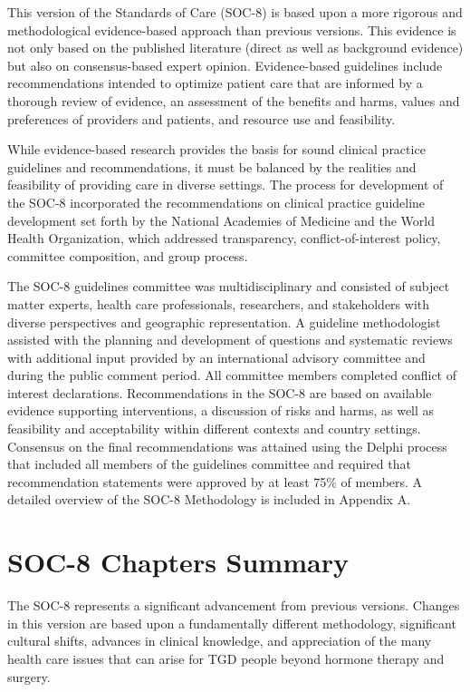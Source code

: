 \documentclass[
]{book}
\begin{document}
This version of the Standards of Care (SOC-8)
is based upon a more rigorous and methodological evidence-based approach than previous versions. This evidence is not only based on the
published literature (direct as well as background
evidence) but also on consensus-based expert
opinion. Evidence-based guidelines include recommendations intended to optimize patient care
that are informed by a thorough review of evidence, an assessment of the benefits and harms,
values and preferences of providers and patients,
and resource use and feasibility.

While evidence-based research provides the
basis for sound clinical practice guidelines and
recommendations, it must be balanced by the
realities and feasibility of providing care in
diverse settings. The process for development of
the SOC-8 incorporated the recommendations on
clinical practice guideline development set forth
by the National Academies of Medicine and the
World Health Organization, which addressed
transparency, conflict-of-interest policy, committee composition, and group process.

The SOC-8 guidelines committee was multidisciplinary and consisted of subject matter experts,
health care professionals, researchers, and stakeholders with diverse perspectives and geographic
representation. A guideline methodologist assisted
with the planning and development of questions
and systematic reviews with additional input provided by an international advisory committee and
during the public comment period. All committee
members completed conflict of interest declarations. Recommendations in the SOC-8 are based
on available evidence supporting interventions, a
discussion of risks and harms, as well as feasibility
and acceptability within different contexts and
country settings. Consensus on the final recommendations was attained using the Delphi process
that included all members of the guidelines committee and required that recommendation statements were approved by at least 75\% of members.
A detailed overview of the SOC-8 Methodology
is included in Appendix A.

\hypertarget{soc-8-chapters-summary}{%
\section*{SOC-8 Chapters Summary}\label{soc-8-chapters-summary}}

The SOC-8 represents a significant advancement
from previous versions. Changes in this version
are based upon a fundamentally different methodology, significant cultural shifts, advances in
clinical knowledge, and appreciation of the many
health care issues that can arise for TGD people
beyond hormone therapy and surgery.
\end{document}
